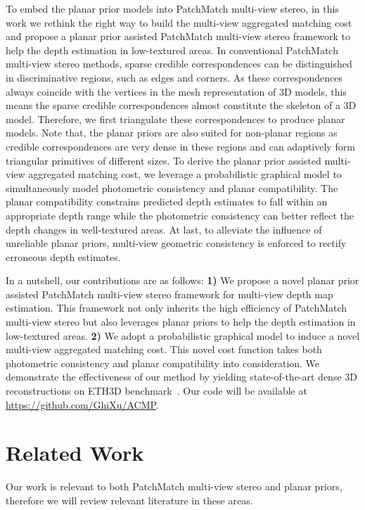 \documentclass[letterpaper]{article} %
\begin{document}
To embed the planar prior models into PatchMatch multi-view stereo, in this work we rethink the right way to build the multi-view aggregated matching cost and propose a planar prior assisted PatchMatch multi-view stereo framework to help the depth estimation in low-textured areas. In conventional PatchMatch multi-view stereo methods,  sparse credible correspondences can be distinguished in discriminative regions, such as edges and corners. As these correspondences always coincide with the vertices in the mesh representation of 3D models, this means the sparse credible correspondences almost constitute the skeleton of a 3D model. Therefore, we first triangulate these correspondences to produce planar models. Note that, the planar priors are also suited for non-planar regions as credible correspondences are very dense in these regions and can adaptively form triangular primitives of different sizes. To derive the planar prior assisted multi-view aggregated matching cost, we leverage a probabilistic graphical model to simultaneously model photometric consistency and planar compatibility. The planar compatibility constrains predicted depth estimates to fall within an appropriate depth range while the photometric consistency can better reflect the depth changes in well-textured areas. At last, to alleviate the influence of unreliable planar priors, multi-view geometric consistency is enforced to rectify erroneous depth estimates.     

In a nutshell, our contributions are as follows: {\bf 1)} We propose a novel planar prior assisted PatchMatch multi-view stereo framework for multi-view depth map estimation. This framework not only inherits the high efficiency of PatchMatch multi-view stereo but also leverages planar priors to help the depth estimation in low-textured areas. {\bf 2)} We adopt a probabilistic graphical model to induce a novel multi-view aggregated matching cost. This novel cost function takes both photometric consistency and planar compatibility into consideration. We demonstrate the effectiveness of our method by yielding state-of-the-art dense 3D reconstructions on ETH3D benchmark~\cite{Schops2017Multi}. Our code will be available at \url{https://github.com/GhiXu/ACMP}.

\section{Related Work}

Our work is relevant to both PatchMatch multi-view stereo and planar priors, therefore we will review relevant literature in these areas. 
\end{document}
